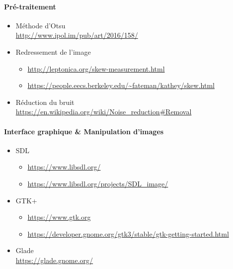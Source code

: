 \paragraph{\bfseries{Pré-traitement}}

\begin{itemize}
    \item Méthode d'Otsu \\ \url{http://www.ipol.im/pub/art/2016/158/}
    \item Redressement de l'image
        \begin{itemize}
            \item \url{http://leptonica.org/skew-measurement.html}
            \item \url{https://people.eecs.berkeley.edu/~fateman/kathey/skew.html}
        \end{itemize}
    \item Réduction du bruit \\
    \url{https://en.wikipedia.org/wiki/Noise_reduction#Removal}
\end{itemize}

\newpage

\paragraph{\bfseries{Interface graphique \& Manipulation d'images}}

\begin{itemize}
    \item SDL
        \begin{itemize}
            \item \url{https://www.libsdl.org/}
            \item \url{https://www.libsdl.org/projects/SDL_image/}
        \end{itemize}
    \item GTK+
        \begin{itemize}
            \item \url{https://www.gtk.org}
            \item
                \url{https://developer.gnome.org/gtk3/stable/gtk-getting-started.html}
        \end{itemize}
    \item Glade \\ \url{https://glade.gnome.org/}
\end{itemize}
